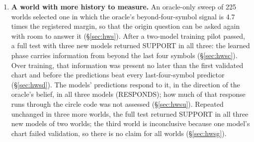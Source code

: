 \documentclass[11pt,a4paper]{article}
\DeclareRobustCommand{\_}{\ifmmode\origunderscore\else\textunderscore\allowbreak\fi}
\begin{document}
\begin{enumerate}
\S\ref{sec:x6}, \S\ref{sec:x6s1results}). A follow-up check left the cause of one control's
response to the designed placebo unexplained (\S\ref{sec:x6zc}).
\item \textbf{A world with more history to measure.} An oracle-only sweep of 225 worlds selected
one in which the oracle's beyond-four-symbol signal is 4.7 times the registered margin, so that
the origin question can be asked again with room to answer it (\S\ref{sec:hws}). After a
two-model training pilot passed, a full test with three new models returned SUPPORT in all three:
the learned phase carries information from beyond the last four symbols (\S\ref{sec:hwsc}).
Over training, that information was present no later than the first validated chart and before
the predictions beat every last-four-symbol predictor (\S\ref{sec:hwsd}). The models' predictions
respond to it, in the direction of the oracle's belief, in all three models (RESPONDS); how much
of that response runs through the circle code was not assessed (\S\ref{sec:hwsu}).
Repeated unchanged in three more worlds, the full test returned SUPPORT in all three new models
of two worlds; the third world is inconclusive because one model's chart failed validation, so
there is no claim for all worlds (\S\ref{sec:hwsg}).
\end{enumerate}
\end{document}
